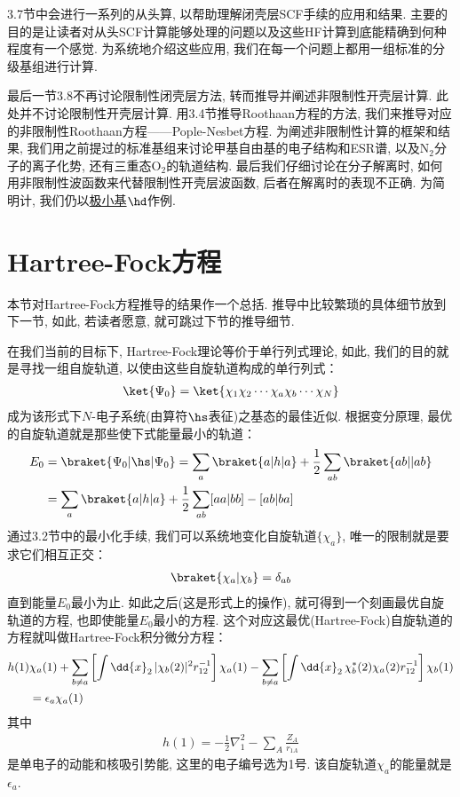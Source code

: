 3.7节中会进行一系列的从头算, 以帮助理解闭壳层SCF手续的应用和结果. 主要的目的是让读者对从头SCF计算能够处理的问题以及这些HF计算到底能精确到何种程度有一个感觉. 为系统地介绍这些应用, 我们在每一个问题上都用一组标准的分级基组进行计算.

最后一节3.8不再讨论限制性闭壳层方法, 转而推导并阐述非限制性开壳层计算. 此处并不讨论限制性开壳层计算. 用3.4节推导Roothaan方程的方法, 我们来推导对应的非限制性Roothaan方程——Pople-Nesbet方程. 为阐述非限制性计算的框架和结果, 我们用之前提过的标准基组来讨论甲基自由基的电子结构和ESR谱, 以及$\mathrm{N}_2$分子的离子化势, 还有三重态$\mathrm{O}_2$的轨道结构. 最后我们仔细讨论在分子解离时, 如何用非限制性波函数来代替限制性开壳层波函数, 后者在解离时的表现不正确. 为简明计, 我们仍以\underline{极小基$\hd$}作例.

\section{Hartree-Fock方程}
本节对Hartree-Fock方程推导的结果作一个总括. 推导中比较繁琐的具体细节放到下一节, 如此, 若读者愿意, 就可跳过下节的推导细节. 

在我们当前的目标下, Hartree-Fock理论等价于单行列式理论, 如此, 我们的目的就是寻找一组自旋轨道, 以使由这些自旋轨道构成的单行列式：
\begin{align}
\ket{\Psi_0} = \ket{\chi_1\chi_2\cdots\chi_a\chi_b\cdots\chi_N}
\end{align}
成为该形式下$N$-电子系统(由算符$\hs$表征)之基态的最佳近似. 根据变分原理, 最优的自旋轨道就是那些使下式能量最小的轨道：
\begin{align}
E_0 & = \braket{\Psi_0|\hs|\Psi_0} = \sum_a\braket{a|h|a} + \frac{1}{2}\sum_{ab}\braket{ab||ab}\notag \\
    & = \sum_a\braket{a|h|a} + \frac{1}{2}\sum_{ab}[aa|bb]-[ab|ba]
\end{align}
通过3.2节中的最小化手续, 我们可以系统地变化自旋轨道$\{\chi_a\}$, 唯一的限制就是要求它们相互正交：
\begin{align}
\braket{\chi_a|\chi_b} = \delta_{ab}
\end{align} 
直到能量$E_0$最小为止. 如此之后(这是形式上的操作), 就可得到一个刻画最优自旋轨道的方程, 也即使能量$E_0$最小的方程. 这个对应这最优(Hartree-Fock)自旋轨道的方程就叫做Hartree-Fock积分微分方程：
\begin{align}
\label{3.4}
h(1)&\chi_a(1) + \sum_{b\neq a}\left[ \int\dd{x}_2\,|\chi_b(2)|^2 r_{12}^{-1} \right]\chi_a(1) - \sum_{b\neq a}\left[ \int\dd{x}_2\,\chi_b^*(2)\chi_a(2) r_{12}^{-1} \right]\chi_b(1)\notag\\
&=\epsilon_a\chi_a(1)
\end{align}
其中
\begin{align}
h(1) = -\frac{1}{2}\nabla_1^2 - \sum_A\frac{Z_A}{r_{1A}}
\end{align}
是单电子的动能和核吸引势能, 这里的电子编号选为1号. 该自旋轨道$\chi_a$的能量就是$\epsilon_a$.

